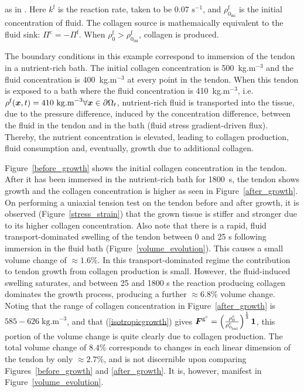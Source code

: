 \noindent as in \citet{growthpaper}. Here $k^\mathrm{f}$ is the
reaction rate, taken to be 0.07 $\mathrm{s}^{-1}$, and
$\rho_{0_\mathrm{ini}}^\mathrm{f}$ is the initial 
concentration of fluid. The collagen
source is mathemaically equivalent to the fluid sink: $\Pi^\mathrm{c} =
-\Pi^\mathrm{f}$. When $\rho_{0}^\mathrm{f} >
\rho_{0_\mathrm{ini}}^\mathrm{f}$, collagen is produced.

The boundary conditions in this example correspond to immersion of the
tendon in a nutrient-rich bath. The initial collagen concentration is
500~kg.m$^{-3}$ and the fluid concentration is 400~kg.m$^{-3}$ at
every point in the tendon. When this tendon is exposed to a bath
where the fluid concentration is 410~kg.m$^{-3}$,
i.e. $\rho^\mathrm{f}(\mbox{\boldmath$ x$},t)=410~\mathrm{kg.m}^{-3} \forall \mbox{\boldmath$ x$} \in
\partial\Omega_t$, nutrient-rich fluid is transported into the tissue,
due to the pressure difference, induced by the concentration
difference, between the fluid in the tendon and in 
the bath (fluid stress gradient-driven flux). Thereby, the nutrient
concentration is elevated, leading to collagen production, fluid
consumption and, eventually, growth due to additional collagen. 

Figure~\ref{before_growth} shows the initial collagen concentration in
the tendon. After it has been immersed in the nutrient-rich bath for
1800~s, the tendon shows growth and the collagen concentration is
higher as seen in Figure~\ref{after_growth}. On performing a
uniaxial tension test on the tendon before and after growth, it is
observed (Figure~\ref{stress_strain}) that the grown tissue is stiffer
and stronger due to its higher collagen concentration. Also note that
there is a rapid, fluid transport-dominated swelling 
of the tendon  between 0 and 25 s 
following immersion in the fluid bath
(Figure~\ref{volume_evolution}). This causes a small volume change of 
$\approx 1.6$\%. In this transport-dominated regime the contribution
to tendon growth from collagen production is small. However, the
fluid-induced swelling saturates, and between
25 and 1800 s the reaction producing collagen dominates the growth
process, producing a further $\approx 6.8$\% volume change. Noting that the
range of collagen concentration in Figure~\ref{after_growth} is
$585-626\; \mbox{kg.m}^{-3}$, and that (\ref{isotropicgrowth}) gives $\mbox{\boldmath$ F$}^{\mathrm{g}^\mathrm{c}} = \left(
  \frac{\rho_0^\mathrm{c}}{\rho_{0_{\mathrm{ini}}}^\mathrm{c}}
  \right)^  {\frac{1}{3}} {\bf 1}$, this portion of the volume change
  is quite clearly due to collagen production. The total volume change
  of $8.4$\% corresponds to changes in each linear dimension of the
  tendon by only $\approx 2.7$\%, and is not discernible upon comparing
  Figures~\ref{before_growth} and \ref{after_growth}. It is, however,
  manifest in Figure~\ref{volume_evolution}.

